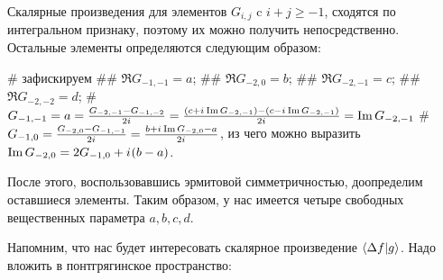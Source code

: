 Скалярные произведения для элементов $G_{i, j}$ c $i + j \ge -1$, сходятся по интегральном признаку, поэтому их можно получить непосредственно. Остальные элементы определяются следующим образом:

\begin{elist}
# зафискируем
## $\Re G_{-1, -1} = a$;
## $\Re G_{-2, 0} = b$;
## $\Re G_{-2, -1} = c$;
## $\Re G_{-2, -2} = d$;
# $G_{-1, -1} = a = \frac{G_{-2, -1} - G_{-1, -2}}{2 {i\mkern1mu}} = \frac{(c + {i\mkern1mu} \Im G_{-2, -1}) - (c - {i\mkern1mu} \Im G_{-2, -1})}{2 {i\mkern1mu}} = \Im G_{-2, -1}$
# $G_{-1, 0} = \frac{G_{-2, 0} - G_{-1, -1}}{2 {i\mkern1mu}} = \frac{b + {i\mkern1mu} \Im G_{-2, 0} - a}{2 {i\mkern1mu}}$, из чего можно выразить $\Im G_{-2, 0} = 2 G_{-1, 0} + {i\mkern1mu} (b - a)$.
\end{elist}




После этого, воспользовавшись эрмитовой симметричностью, доопределим оставшиеся элементы. Таким образом, у нас имеется четыре свободных вещественных параметра $a, b, c, d$.


Напомним, что нас будет интересовать скалярное произведение $\ip{\Delta f}{g}$. Надо вложить в понтгрягинское пространство:

